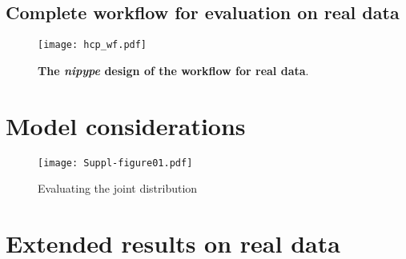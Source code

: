 \documentclass[a4paper]{report}
\begin{document}
\subsection{Complete workflow for evaluation on real data}
\begin{figure}[!ht]
  \texttt{[image: hcp\_wf.pdf]}
  \caption{\textbf{The \emph{nipype} design of the workflow for real data}.}\label{fig:wf_hcp}
\end{figure}

\newpage
\section{Model considerations}

\begin{figure*}[!ht]
	\texttt{[image: Suppl-figure01.pdf]}
	\caption{Evaluating the joint distribution}\label{fig:jointplot}
\end{figure*}

\newpage
\section{Extended results on real data}

\immediate{}




\end{document}
